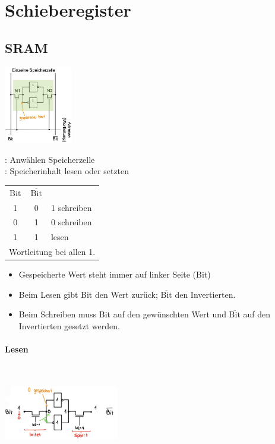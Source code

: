 \section{Schieberegister}
\subsection{SRAM}
\begin{center}
    \begin{minipage}{0.45\linewidth}
        \includegraphics[width = 30mm]{images/sram_store.JPG}
    \end{minipage}
    \hfill
    \begin{minipage}{0.5\linewidth}
        : Anwählen Speicherzelle\\
        : Speicherinhalt lesen oder setzten
        \begin{center}
            \begin{tabular}{c c l}
                Bit & $\overline{\text{Bit}}$ & \\
                1 & 0 & 1 schreiben\\
                0 & 1 & 0 schreiben\\
                1 & 1 & lesen\\
                \multicolumn{3}{l}{Wortleitung bei allen 1.}
            \end{tabular}
        \end{center}
    \end{minipage}
\end{center}
\begin{itemize}
    \item Gespeicherte Wert steht immer auf linker Seite (Bit)
    \item Beim Lesen gibt Bit den Wert zurück; $\overline{\text{Bit}}$ den Invertierten.
    \item Beim Schreiben muss Bit auf den gewünschten Wert und $\overline{\text{Bit}}$ auf den Invertierten gesetzt werden.
\end{itemize}
\paragraph{Lesen}\mbox{}\\
\begin{center}
    \includegraphics[width = 50mm]{images/sram_read.JPG}
\end{center}
